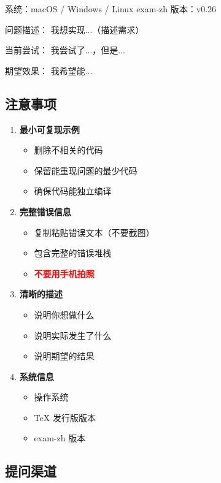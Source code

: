 \begin{latexcode}
系统：macOS / Windows / Linux
exam-zh 版本：v0.26

问题描述：
  我想实现...（描述需求）

当前尝试：
  我尝试了...，但是...

期望效果：
  我希望能...
\end{latexcode}


\subsection{注意事项}

\begin{enumerate}
  \item \textbf{最小可复现示例}
    \begin{itemize}
      \item 删除不相关的代码
      \item 保留能重现问题的最少代码
      \item 确保代码能独立编译
    \end{itemize}

  \item \textbf{完整错误信息}
    \begin{itemize}
      \item 复制粘贴错误文本（不要截图）
      \item 包含完整的错误堆栈
      \item \textcolor{red}{\textbf{不要用手机拍照}}
    \end{itemize}

  \item \textbf{清晰的描述}
    \begin{itemize}
      \item 说明你想做什么
      \item 说明实际发生了什么
      \item 说明期望的结果
    \end{itemize}

  \item \textbf{系统信息}
    \begin{itemize}
      \item 操作系统
      \item \TeX{} 发行版版本
      \item exam-zh 版本
    \end{itemize}
\end{enumerate}


\subsection{提问渠道}

